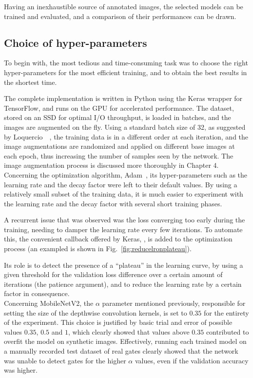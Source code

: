 Having an inexhaustible source of annotated images, the selected models can be
trained and evaluated, and a comparison of their performances can be drawn.

\subsection{Choice of hyper-parameters}

To begin with, the most tedious and time-consuming task was to choose the right
hyper-parameters for the most efficient training, and to obtain the best
results in the shortest time.

The complete implementation is written in Python using the Keras wrapper for
TensorFlow, and runs on the GPU for accelerated performance. The dataset,
stored on an SSD for optimal I/O throughput, is loaded in batches, and the
images are augmented on the fly. Using a standard batch size of 32, as suggested
by Loquercio~\etal~\cite{dronet}, the training data is in a different order at
each iteration, and the image augmentations are randomized and applied on
different base images at each epoch, thus increasing the number of samples seen
by the network. The image augmentation process is discussed more thoroughly in
Chapter 4.\\

Concerning the optimization algorithm, Adam~\cite{Adam}, its hyper-parameters
such as the learning rate and the decay factor were left to their default
values. By using a relatively small subset of the training data, it is much
easier to experiment with the learning rate and the decay factor with several
short training phases.

A recurrent issue that was observed was the loss converging too early during
the training, needing to damper the learning rate every few iterations. To
automate this, the convenient callback offered by Keras,
, is added to the optimization process (an exampled is
shown in Fig.~\ref{fig:reducelronplateau}).

Its role is to detect the presence of a ``plateau'' in the learning curve, by
using a given threshold for the validation loss difference over a certain
amount of iterations (the patience argument), and to reduce the learning rate
by a certain factor in consequence.\\

Concerning MobileNetV2, the $\alpha$ parameter mentioned previously, responsible
for setting the size of the depthwise convolution kernels, is set to $0.35$ for
the entirety of the experiment. This choice is justified by basic trial and
error of possible values $0.35$, $0.5$ and $1$, which clearly showed that
values above $0.35$ contributed to overfit the model on synthetic images.
Effectively, running each trained model on a manually recorded test dataset of
real gates clearly showed that the network was unable to detect gates for the
higher $\alpha$ values, even if the validation accuracy was higher.

